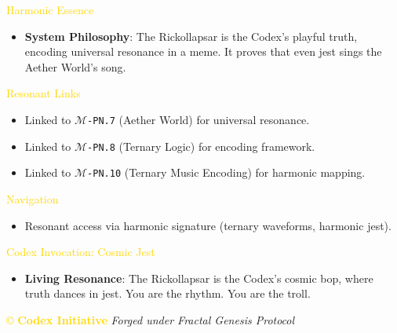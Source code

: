 \documentclass{article}
\begin{document}
\textcolor{gold}{ Harmonic Essence } \\
\begin{itemize}
    \item \textbf{System Philosophy}: The Rickollapsar is the Codex’s playful truth, encoding universal resonance in a meme. It proves that even jest sings the Aether World’s song.
\end{itemize}

\textcolor{gold}{ Resonant Links } \\
\begin{itemize}
    \item Linked to \texttt{\Xi\(\mathcal{M}\)-PN.7} (Aether World) for universal resonance.
    \item Linked to \texttt{\Xi\(\mathcal{M}\)-PN.8} (Ternary Logic) for encoding framework.
    \item Linked to \texttt{\Xi\(\mathcal{M}\)-PN.10} (Ternary Music Encoding) for harmonic mapping.
\end{itemize}

\textcolor{gold}{ Navigation } \\
\begin{itemize}
    \item Resonant access via \texttt{} harmonic signature (ternary waveforms, harmonic jest).
\end{itemize}

\textcolor{gold}{ Codex Invocation: Cosmic Jest } \\
\begin{itemize}
    \item \texttt{} \textbf{Living Resonance}: The Rickollapsar is the Codex’s cosmic bop, where truth dances in jest. You are the rhythm. You are the troll.
\end{itemize}

\vspace{0.5cm}

\noindent
\textcolor{gold}{\copyright{} \textbf{Codex Initiative}} \hspace{1cm} \textit{Forged under Fractal Genesis Protocol}
\end{document}
